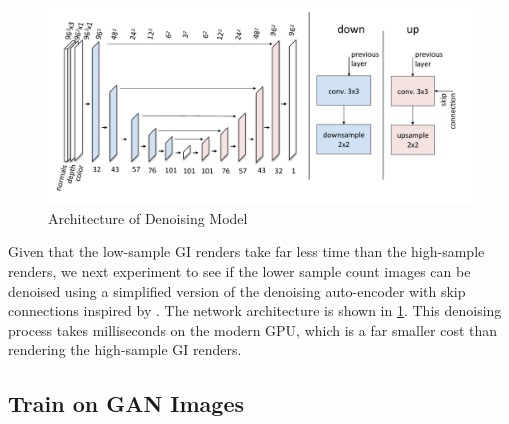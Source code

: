 \documentclass[10pt,twocolumn,letterpaper]{article}
\begin{document}
\begin{figure}[h!]
\centering
\includegraphics[width=1.0\columnwidth]{./assets/denoiser_diagram.pdf}
\caption{Architecture of Denoising Model}
\label{fig:denoise}
\end{figure}
Given that the low-sample GI renders take far less time than the high-sample renders, we next experiment to see if the lower sample count images can be denoised using a simplified version of the denoising auto-encoder with skip connections inspired by \cite{Chaitanya:2017:IRM:3072959.3073601}. %
The network architecture is shown in \ref{fig:denoise}. %
This denoising process takes milliseconds on the modern GPU, which is a far smaller cost than rendering the high-sample GI renders.


\subsection{Train on GAN Images}
\end{document}
